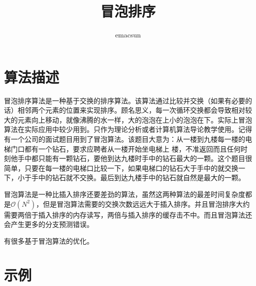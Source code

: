 \documentclass[10pt,a4paper,UTF8]{article}
\author{emacsun}
\date{}
\title{冒泡排序}
\begin{document}
\maketitle
\tableofcontents
{}

\section{算法描述}
\label{sec:org24d6d95}


冒泡排序算法是一种基于交换的排序算法。该算法通过比较并交换（如果有必要的话）相邻两个元素的位置来实现排序。顾名思义，每一次循环交换都会导致相对较大的元素向上移动，就像沸腾的水一样，大的泡泡在上小的泡泡在下。实际上冒泡算法在实际应用中较少用到。只作为理论分析或者计算机算法导论教学使用。记得有一个公司的面试题目用到了冒泡算法。该题目大意为：从一楼到九楼每一楼的电梯门口都有一个钻石，要求应聘者从一楼开始坐电梯上
楼，不准返回而且任何时刻他手中都只能有一颗钻石，要他到达九楼时手中的钻石最大的一颗。这个题目很简单，只要在每一楼的电梯口比较一下，如果电梯口的钻石大于手中的就交换一下，小于手中的钻石就不交换。最后到达九楼手中的钻石就自然是最大的一颗。

冒泡算法是一种比插入排序还要差劲的算法，虽然这两种算法的最差时间复杂度都是\(\mathcal{O}(N^{2})\)，但是冒泡算法需要的交换次数远远大于插入排序。并且冒泡排序大约需要两倍于插入排序的内存读写，两倍与插入排序的缓存击不中。而且冒泡算法还会产生更多的分支预测错误。

有很多基于冒泡算法的优化。
\section{示例}
\label{sec:orgc953ddf}
\end{document}
